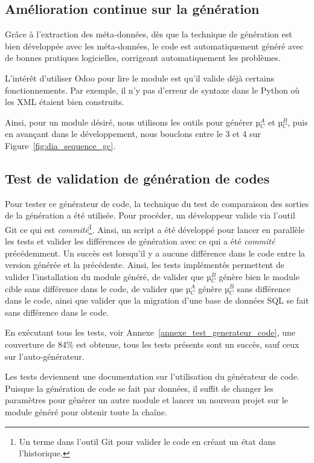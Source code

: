 \subsection {Amélioration continue sur la génération}

Grâce à l’extraction des méta-données, dès que la technique de génération est bien développée avec les méta-données, le code est automatiquement généré avec de bonnes pratiques logicielles, corrigeant automatiquement les problèmes.

L’intérêt d'utiliser Odoo pour lire le module est qu'il valide déjà certains fonctionnements. Par exemple, il n'y pas d’erreur de syntaxe dans le Python où les XML étaient bien construits.

Ainsi, pour un module désiré, nous utilisons les outils pour générer µ$_C^A$ et µ$_C^B$, puis en avançant dans le développement, nous bouclons entre le 3 et 4 sur Figure~\ref{fig:dia_sequence_gc}.

\subsection {Test de validation de génération de codes}\label{test_validation_generation_code_resultat}

Pour tester ce générateur de code, la technique du test de comparaison des sorties de la génération a été utilisée. Pour procéder, un développeur valide via l'outil Git ce qui est \textit{commité}\footnote{Un terme dans l'outil Git pour valider le code en créant un état dans l'historique.}. Ainsi, un script a été développé pour lancer en parallèle les tests et valider les différences de génération avec ce qui a été \textit{commité} précédemment. Un succès est lorsqu'il y a aucune différence dans le code entre la version générée et la précédente. Ainsi, les tests implémentés permettent de valider l’installation du module généré, de valider que µ$_C^B$ génère bien le module cible sans différence dans le code, de valider que µ$_C^A$ génère µ$_C^B$ sans différence dans le code, ainsi que valider que la migration d’une base de données SQL se fait sans différence dans le code.

En exécutant tous les tests, voir Annexe~\ref{annexe_test_generateur_code}, une couverture de 84\% est obtenue, tous les tests présents sont un succès, sauf ceux sur l’auto-générateur.

Les tests deviennent une documentation sur l'utilisation du générateur de code. Puisque la génération de code se fait par données, il suffit de changer les paramètres pour générer un autre module et lancer un nouveau projet sur le module généré pour obtenir toute la chaîne.

